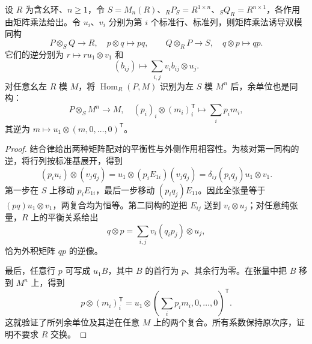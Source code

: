 \begin{proposition}[行列双模的互逆配对]\label{b2:prop:matrix-row-column-bimodules}
	设 \(R\) 为含幺环、\(n\ge1\)，令 \(S=M_n(R)\)、\({}_RP_S=R^{1\times n}\)、\({}_SQ_R=R^{n\times1}\)，各作用由矩阵乘法给出。令 \(u_i\)、\(v_i\) 分别为第 \(i\) 个标准行、标准列，则矩阵乘法诱导双模同构
	\[
		P\otimes_SQ\longrightarrow R,\quad p\otimes q\longmapsto pq, \qquad Q\otimes_RP\longrightarrow S,\quad q\otimes p\longmapsto qp.
	\]
	它们的逆分别为 \(r\mapsto ru_1\otimes v_1\) 和
	\[
		(b_{ij})\longmapsto\sum_{i,j}v_i b_{ij}\otimes u_j.
	\]
	对任意幺左 \(R\) 模 \(M\)，将 \(\operatorname{Hom}_R(P,M)\) 识别为左 \(S\) 模 \(M^n\) 后，余单位也是同构：
	\[
		P\otimes_SM^n\longrightarrow M,\quad (p_i)_i\otimes(m_i)_i^{\mathsf T}\longmapsto\sum_i p_i m_i,
	\]
	其逆为 \(m\mapsto u_1\otimes(m,0,\ldots,0)^{\mathsf T}\)。
\end{proposition}
\begin{proof}
	结合律给出两种矩阵配对的平衡性与外侧作用相容性。为核对第一同构的逆，将行列按标准基展开，得到
	\[
		(p_i u_i)\otimes(v_jq_j) =u_1\otimes (p_iE_{1i})(v_jq_j) =\delta_{ij}(p_iq_j)u_1\otimes v_1.
	\]
	第一步在 \(S\) 上移动 \(p_iE_{1i}\)，最后一步移动 \((p_iq_j)E_{11}\)。因此全张量等于 \((pq)u_1\otimes v_1\)，两复合均为恒等。第二同构的逆把 \(E_{ij}\) 送到 \(v_i\otimes u_j\)；对任意纯张量，\(R\) 上的平衡关系给出
	\[
		q\otimes p=\sum_{i,j}v_i(q_i p_j)\otimes u_j,
	\]
	恰为外积矩阵 \(qp\) 的逆像。

	最后，任意行 \(p\) 可写成 \(u_1B\)，其中 \(B\) 的首行为 \(p\)、其余行为零。在张量中把 \(B\) 移到 \(M^n\) 上，得到
	\[
		p\otimes(m_i)_i^{\mathsf T} =u_1\otimes\left(\sum_i p_i m_i,0,\ldots,0\right)^{\mathsf T}.
	\]
	这就验证了所列余单位及其逆在任意 \(M\) 上的两个复合。所有系数保持原次序，证明不要求 \(R\) 交换。
\end{proof}
